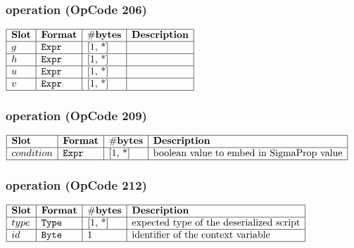 \subsubsection{ operation (OpCode 206)}

\noindent
\(\begin{array}{| l | l | l | l |}
    \hline
    \bf{Slot} & \bf{Format} & \bf{\#bytes} & \bf{Description} \\
    \hline
         g & \lst{Expr} & \text{[1, *]} & \text{} \\
    \hline
           h & \lst{Expr} & \text{[1, *]} & \text{} \\
    \hline
           u & \lst{Expr} & \text{[1, *]} & \text{} \\
    \hline
           v & \lst{Expr} & \text{[1, *]} & \text{} \\
    \hline
      
\end{array}\)
       

\subsubsection{ operation (OpCode 209)}

\noindent
\(\begin{array}{| l | l | l | l |}
    \hline
    \bf{Slot} & \bf{Format} & \bf{\#bytes} & \bf{Description} \\
    \hline
         condition & \lst{Expr} & \text{[1, *]} & \text{boolean value to embed in SigmaProp value} \\
    \hline
      
\end{array}\)
       

\subsubsection{ operation (OpCode 212)}

\noindent
\(\begin{array}{| l | l | l | l |}
    \hline
    \bf{Slot} & \bf{Format} & \bf{\#bytes} & \bf{Description} \\
    \hline
         type & \lst{Type} & \text{[1, *]} & \text{expected type of the deserialized script} \\
    \hline
           id & \lst{Byte} & \text{1} & \text{identifier of the context variable} \\
    \hline
      
\end{array}\)
       

